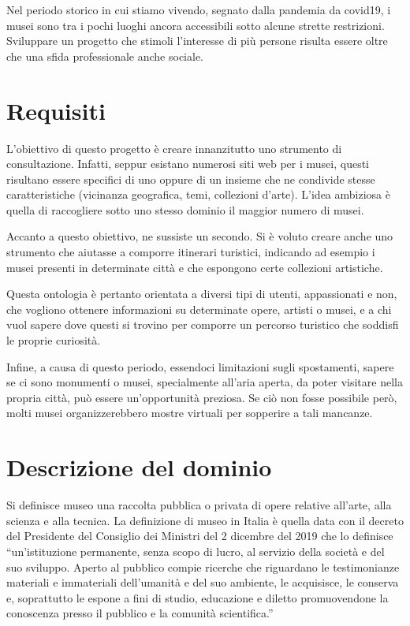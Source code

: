 \documentclass[12pt]{article}
\begin{document}
Nel periodo storico in cui stiamo vivendo, segnato dalla pandemia da covid19, i musei sono tra i pochi luoghi ancora accessibili sotto alcune strette restrizioni. Sviluppare un progetto che stimoli l’interesse di più persone risulta essere oltre che una sfida professionale anche sociale.
\section{Requisiti}
L’obiettivo di questo progetto è creare innanzitutto uno strumento di consultazione. Infatti, seppur esistano numerosi siti web per i musei, questi risultano essere specifici di uno oppure di un insieme che ne condivide stesse caratteristiche (vicinanza geografica, temi, collezioni d’arte). 
L’idea ambiziosa è quella di raccogliere sotto uno stesso dominio il maggior numero di musei.

Accanto a questo obiettivo, ne sussiste un secondo. Si è voluto creare anche uno strumento che aiutasse a comporre itinerari turistici, indicando ad esempio i musei presenti in determinate città e che espongono certe collezioni artistiche.

Questa ontologia è pertanto orientata a diversi tipi di utenti, appassionati e non, che vogliono ottenere informazioni su determinate opere, artisti o musei, e a chi vuol sapere dove questi si trovino per comporre un percorso turistico che soddisfi le proprie curiosità.

Infine, a causa di questo periodo, essendoci limitazioni sugli spostamenti, sapere se ci sono monumenti o musei, specialmente all’aria aperta, da poter visitare nella propria città, può essere un’opportunità preziosa. Se ciò non fosse possibile però, molti musei organizzerebbero mostre virtuali per sopperire a tali mancanze.
\newpage
\section{Descrizione del dominio}
Si definisce museo una raccolta pubblica o privata di opere relative all’arte, alla scienza e alla tecnica. La definizione di museo in Italia è quella data con il decreto del Presidente del Consiglio dei Ministri del 2 dicembre del 2019 che lo definisce “un’istituzione permanente, senza scopo di lucro, al servizio della società e del suo sviluppo. Aperto al pubblico compie ricerche che riguardano le testimonianze materiali e immateriali dell’umanità e del suo ambiente, le acquisisce, le conserva e, soprattutto le espone a fini di studio, educazione e diletto promuovendone la conoscenza presso il pubblico e la comunità scientifica.” \parencite{def1}
\end{document}
